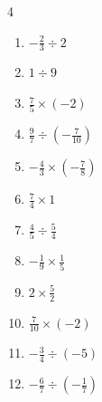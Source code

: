 \begin{multicols}{4}
\begin{enumerate}
  \item $\displaystyle -\frac{2}{3}\div{}2$


  \item $\displaystyle 1\div{}9$


  \item $\displaystyle \frac{7}{5}\times{}\left(-2\right)$


  \item $\displaystyle \frac{9}{7}\div{}\left(-\frac{7}{10}\right)$


  \item $\displaystyle -\frac{4}{3}\times{}\left(-\frac{7}{8}\right)$


  \item $\displaystyle \frac{7}{4}\times{}1$


  \item $\displaystyle \frac{4}{5}\div{}\frac{5}{4}$


  \item $\displaystyle -\frac{1}{9}\times{}\frac{1}{5}$


  \item $\displaystyle 2\times{}\frac{5}{2}$

        \phantom{$\displaystyle =5$}

  \item $\displaystyle \frac{7}{10}\times{}\left(-2\right)$


\columnbreak %

  \item $\displaystyle -\frac{3}{4}\div{}\left(-5\right)$


  \item $\displaystyle -\frac{6}{7}\div{}\left(-\frac{1}{7}\right)$


\end{enumerate}
\end{multicols}
